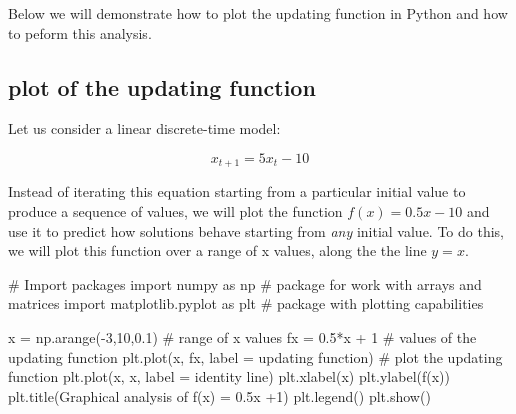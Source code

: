 \documentclass[
  letterpaper,
  DIV=11,
  numbers=noendperiod]{scrreprt}
\newenvironment{Shaded}{\begin{snugshade}}{\end{snugshade}}
\newcommand{\CommentTok}[1]{\textcolor[rgb]{0.37,0.37,0.37}{#1}}
\newcommand{\DecValTok}[1]{\textcolor[rgb]{0.68,0.00,0.00}{#1}}
\newcommand{\FloatTok}[1]{\textcolor[rgb]{0.68,0.00,0.00}{#1}}
\newcommand{\ImportTok}[1]{\textcolor[rgb]{0.00,0.46,0.62}{#1}}
\newcommand{\NormalTok}[1]{\textcolor[rgb]{0.00,0.23,0.31}{#1}}
\newcommand{\OperatorTok}[1]{\textcolor[rgb]{0.37,0.37,0.37}{#1}}
\newcommand{\StringTok}[1]{\textcolor[rgb]{0.13,0.47,0.30}{#1}}
\begin{document}
Below we will demonstrate how to plot the updating function in Python
and how to peform this analysis.

\hypertarget{plot-of-the-updating-function}{%
\subsection{plot of the updating
function}\label{plot-of-the-updating-function}}

Let us consider a linear discrete-time model:

\[
x_{t+1} = 5x_t - 10
\]

Instead of iterating this equation starting from a particular initial
value to produce a sequence of values, we will plot the function
\(f(x) = 0.5 x - 10\) and use it to predict how solutions behave
starting from \emph{any} initial value. To do this, we will plot this
function over a range of x values, along the the line \(y=x\).

\begin{Shaded}
\begin{Highlighting}[]
\CommentTok{\# Import packages}
\ImportTok{import}\NormalTok{ numpy }\ImportTok{as}\NormalTok{ np }\CommentTok{\# package for work with arrays and matrices}
\ImportTok{import}\NormalTok{ matplotlib.pyplot }\ImportTok{as}\NormalTok{ plt }\CommentTok{\# package with plotting capabilities}
\end{Highlighting}
\end{Shaded}

\begin{Shaded}
\begin{Highlighting}[]
\NormalTok{x }\OperatorTok{=}\NormalTok{ np.arange(}\OperatorTok{{-}}\DecValTok{3}\NormalTok{,}\DecValTok{10}\NormalTok{,}\FloatTok{0.1}\NormalTok{) }\CommentTok{\# range of x values}
\NormalTok{fx }\OperatorTok{=} \FloatTok{0.5}\OperatorTok{*}\NormalTok{x }\OperatorTok{+} \DecValTok{1} \CommentTok{\# values of the updating function}
\NormalTok{plt.plot(x, fx, label }\OperatorTok{=} \StringTok{\textquotesingle{}updating function\textquotesingle{}}\NormalTok{) }\CommentTok{\# plot the updating function}
\NormalTok{plt.plot(x, x, label }\OperatorTok{=} \StringTok{\textquotesingle{}identity line\textquotesingle{}}\NormalTok{)}
\NormalTok{plt.xlabel(}\StringTok{\textquotesingle{}x\textquotesingle{}}\NormalTok{)}
\NormalTok{plt.ylabel(}\StringTok{\textquotesingle{}f(x)\textquotesingle{}}\NormalTok{)}
\NormalTok{plt.title(}\StringTok{\textquotesingle{}Graphical analysis of f(x) = 0.5x +1\textquotesingle{}}\NormalTok{)}
\NormalTok{plt.legend()}
\NormalTok{plt.show()}
\end{Highlighting}
\end{Shaded}
\end{document}
